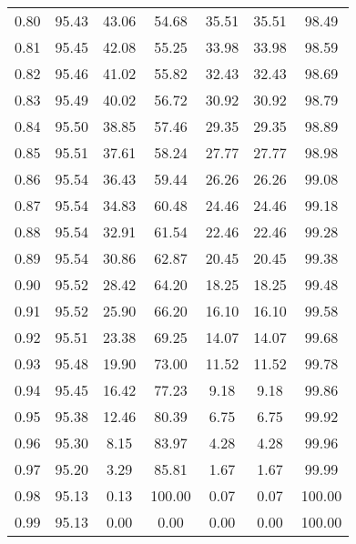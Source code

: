 \begin{tabular}{|c|c|c|c|c|c|c|}
      0.80 &     95.43 &     43.06 &      54.68 &   35.51 &      35.51 &         98.49 \\
      0.81 &     95.45 &     42.08 &      55.25 &   33.98 &      33.98 &         98.59 \\
      0.82 &     95.46 &     41.02 &      55.82 &   32.43 &      32.43 &         98.69 \\
      0.83 &     95.49 &     40.02 &      56.72 &   30.92 &      30.92 &         98.79 \\
      0.84 &     95.50 &     38.85 &      57.46 &   29.35 &      29.35 &         98.89 \\
      0.85 &     95.51 &     37.61 &      58.24 &   27.77 &      27.77 &         98.98 \\
      0.86 &     95.54 &     36.43 &      59.44 &   26.26 &      26.26 &         99.08 \\
      0.87 &     95.54 &     34.83 &      60.48 &   24.46 &      24.46 &         99.18 \\
      0.88 &     95.54 &     32.91 &      61.54 &   22.46 &      22.46 &         99.28 \\
      0.89 &     95.54 &     30.86 &      62.87 &   20.45 &      20.45 &         99.38 \\
      0.90 &     95.52 &     28.42 &      64.20 &   18.25 &      18.25 &         99.48 \\
      0.91 &     95.52 &     25.90 &      66.20 &   16.10 &      16.10 &         99.58 \\
      0.92 &     95.51 &     23.38 &      69.25 &   14.07 &      14.07 &         99.68 \\
      0.93 &     95.48 &     19.90 &      73.00 &   11.52 &      11.52 &         99.78 \\
      0.94 &     95.45 &     16.42 &      77.23 &    9.18 &       9.18 &         99.86 \\
      0.95 &     95.38 &     12.46 &      80.39 &    6.75 &       6.75 &         99.92 \\
      0.96 &     95.30 &      8.15 &      83.97 &    4.28 &       4.28 &         99.96 \\
      0.97 &     95.20 &      3.29 &      85.81 &    1.67 &       1.67 &         99.99 \\
      0.98 &     95.13 &      0.13 &     100.00 &    0.07 &       0.07 &        100.00 \\
      0.99 &     95.13 &      0.00 &       0.00 &    0.00 &       0.00 &        100.00 \\
\bottomrule
\end{tabular}
